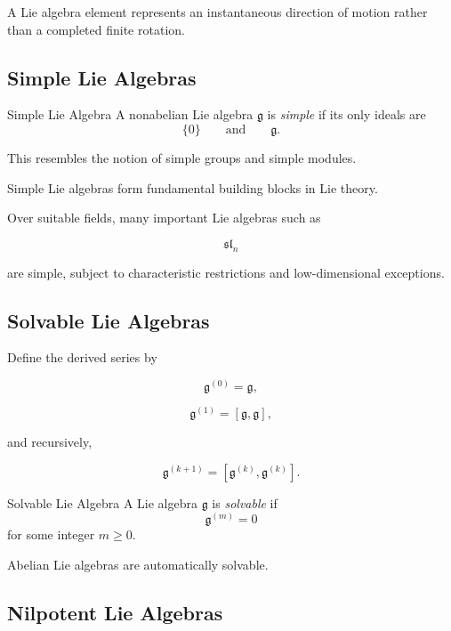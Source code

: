 A Lie algebra element represents an instantaneous direction of motion rather
than a completed finite rotation.

\subsection{Simple Lie Algebras}
\label{subsec:simple-lie-algebras}

\begin{definitionbox}{Simple Lie Algebra}
A nonabelian Lie algebra \(\mathfrak g\) is \emph{simple} if its only ideals
are
\[ \{0\}\qquad\text{and}\qquad\mathfrak g. \]
\end{definitionbox}

This resembles the notion of simple groups and simple modules.

Simple Lie algebras form fundamental building blocks in Lie theory.

Over suitable fields, many important Lie algebras such as

\[ \mathfrak{sl}_n \]

are simple, subject to characteristic restrictions and low-dimensional
exceptions.

\subsection{Solvable Lie Algebras}
\label{subsec:solvable-lie-algebras}

Define the derived series by

\[ \mathfrak g^{(0)}=\mathfrak g, \]

\[ \mathfrak g^{(1)}=[\mathfrak g,\mathfrak g], \]

and recursively,

\[ \mathfrak g^{(k+1)}
=[\mathfrak g^{(k)},\mathfrak g^{(k)}]. \]

\begin{definitionbox}{Solvable Lie Algebra}
A Lie algebra \(\mathfrak g\) is \emph{solvable} if
\[ \mathfrak g^{(m)}=0 \]
for some integer \(m\geq0\).
\end{definitionbox}

Abelian Lie algebras are automatically solvable.

\subsection{Nilpotent Lie Algebras}
\label{subsec:nilpotent-lie-algebras}

